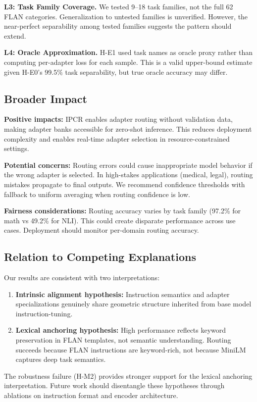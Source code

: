 \textbf{L3: Task Family Coverage.} We tested 9--18 task families, not the full 62 FLAN categories. Generalization to untested families is unverified. However, the near-perfect separability among tested families suggests the pattern should extend.

\textbf{L4: Oracle Approximation.} H-E1 used task names as oracle proxy rather than computing per-adapter loss for each sample. This is a valid upper-bound estimate given H-E0's 99.5\% task separability, but true oracle accuracy may differ.

\subsection{Broader Impact}

\textbf{Positive impacts:} IPCR enables adapter routing without validation data, making adapter banks accessible for zero-shot inference. This reduces deployment complexity and enables real-time adapter selection in resource-constrained settings.

\textbf{Potential concerns:} Routing errors could cause inappropriate model behavior if the wrong adapter is selected. In high-stakes applications (medical, legal), routing mistakes propagate to final outputs. We recommend confidence thresholds with fallback to uniform averaging when routing confidence is low.

\textbf{Fairness considerations:} Routing accuracy varies by task family (97.2\% for math vs 49.2\% for NLI). This could create disparate performance across use cases. Deployment should monitor per-domain routing accuracy.

\subsection{Relation to Competing Explanations}

Our results are consistent with two interpretations:

\begin{enumerate}
    \item \textbf{Intrinsic alignment hypothesis:} Instruction semantics and adapter specializations genuinely share geometric structure inherited from base model instruction-tuning.

    \item \textbf{Lexical anchoring hypothesis:} High performance reflects keyword preservation in FLAN templates, not semantic understanding. Routing succeeds because FLAN instructions are keyword-rich, not because MiniLM captures deep task semantics.
\end{enumerate}

The robustness failure (H-M2) provides stronger support for the lexical anchoring interpretation. Future work should disentangle these hypotheses through ablations on instruction format and encoder architecture.

